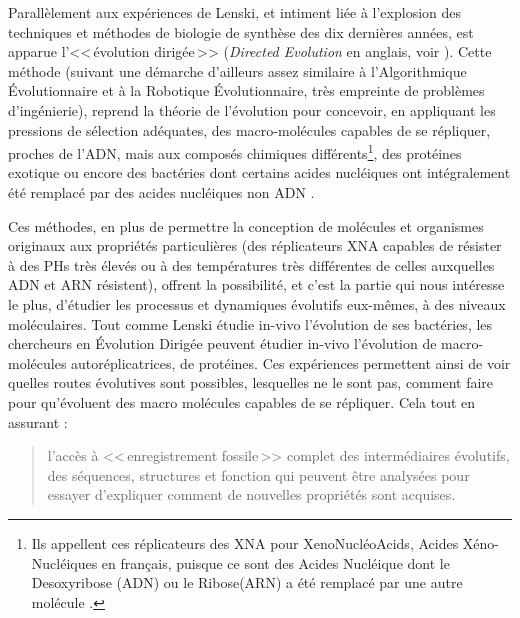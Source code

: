 Parallèlement aux expériences de Lenski, et intiment liée à l'explosion des techniques et méthodes de biologie de synthèse des dix dernières années, est apparue l'<<\,évolution dirigée\,>> (\emph{Directed Evolution} en anglais, voir \cite{romero09exploringproteinfitnesslandscapesbydirectedevolution}). Cette méthode (suivant une démarche d'ailleurs assez similaire à l'Algorithmique \'Evolutionnaire et à la Robotique \'Evolutionnaire, très empreinte de problèmes d'ingénierie), reprend la théorie de l'évolution pour concevoir, en appliquant les pressions de sélection adéquates, des macro-molécules capables de se répliquer, proches de l'ADN, mais aux composés chimiques différents\footnote{Ils appellent ces réplicateurs des XNA pour XenoNucléoAcids, Acides Xéno-Nucléiques en français, puisque ce sont des Acides Nucléique dont le Desoxyribose (ADN) ou le Ribose(ARN) a été remplacé par une autre molécule \citep{pinheiro12xnaworldprogresstowardsreplicationevolutionsyntheticgeneticpolymers,pinheiro12syntheticgeneticpolymerscapableheredityevolution}.}, des protéines exotique ou encore des bactéries dont certains acides nucléiques ont intégralement été remplacé par des acides nucléiques non ADN .

Ces méthodes, en plus de permettre la conception de molécules et organismes originaux aux propriétés particulières (des réplicateurs XNA capables de résister à des PHs très élevés ou à des températures très différentes de celles auxquelles ADN et ARN résistent), offrent la possibilité, et c'est la partie qui nous intéresse le plus, d'étudier les processus et dynamiques évolutifs eux-mêmes, à des niveaux moléculaires. Tout comme Lenski étudie in-vivo l'évolution de ses bactéries, les chercheurs en Évolution Dirigée peuvent étudier in-vivo l'évolution de macro-molécules autoréplicatrices, de protéines. Ces expériences permettent ainsi de voir quelles routes évolutives sont possibles, lesquelles ne le sont pas, comment faire pour qu'évoluent des macro molécules capables de se répliquer. Cela tout en assurant :
\begin{quote}
	l'accès à <<\,enregistrement fossile\,>> complet des intermédiaires évolutifs, des séquences, structures et fonction qui peuvent être analysées pour essayer d'expliquer comment de nouvelles propriétés sont acquises.\\ \citep[p.~872]{romero09exploringproteinfitnesslandscapesbydirectedevolution}
\end{quote}

